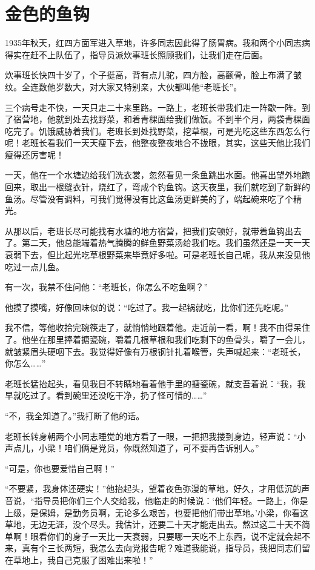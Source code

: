 \documentclass[12pt,UTF-8,openany]{ctexbook}
\begin{document}
\chapter{金色的鱼钩}

\begin{large}
    
    1935年秋天，红四方面军进入草地，许多同志因此得了肠胃病。我和两个小同志病得实在赶不上队伍了，指导员派炊事班长照顾我们，让我们走在后面。
    
    炊事班长快四十岁了，个子挺高，背有点儿驼，四方脸，高颧骨，脸上布满了皱纹。全连数他岁数大，对大家又特别亲，大伙都叫他“老班长”。
    
    三个病号走不快，一天只走二十来里路。一路上，老班长带我们走一阵歇一阵。到了宿营地，他就到处去找野菜，和着青稞面给我们做饭。不到半个月，两袋青稞面吃完了。饥饿威胁着我们。老班长到处找野菜，挖草根，可是光吃这些东西怎么行呢！老班长看我们一天天瘦下去，他整夜整夜地合不拢眼，其实，这些天他比我们瘦得还厉害呢！
    
    一天，他在一个水塘边给我们洗衣裳，忽然看见一条鱼跳出水面。他喜出望外地跑回来，取出一根缝衣针，烧红了，弯成个钓鱼钩。这天夜里，我们就吃到了新鲜的鱼汤。尽管没有调料，可我们觉得没有比这鱼汤更鲜美的了，端起碗来吃了个精光。
    
    从那以后，老班长尽可能找有水塘的地方宿营，把我们安顿好，就带着鱼钩出去了。第二天，他总能端着热气腾腾的鲜鱼野菜汤给我们吃。我们虽然还是一天一天衰弱下去，但比起光吃草根野菜来毕竟好多啦。可是老班长自己呢，我从来没见他吃过一点儿鱼。
    
    有一次，我禁不住问他：“老班长，你怎么不吃鱼啊？”
    
    他摸了摸嘴，好像回味似的说：“吃过了。我一起锅就吃，比你们还先吃呢。”
    
    我不信，等他收拾完碗筷走了，就悄悄地跟着他。走近前一看，啊！我不由得呆住了。他坐在那里捧着搪瓷碗，嚼着几根草根和我们吃剩下的鱼骨头，嚼了一会儿，就皱紧眉头硬咽下去。我觉得好像有万根钢针扎着喉管，失声喊起来：“老班长，你怎么……”
    
    老班长猛抬起头，看见我目不转睛地看着他手里的搪瓷碗，就支吾着说：“我，我早就吃过了。看到碗里还没吃干净，扔了怪可惜的……”
    
    “不，我全知道了。”我打断了他的话。
    
    老班长转身朝两个小同志睡觉的地方看了一眼，一把把我搂到身边，轻声说：“小声点儿，小梁！咱们俩是党员，你既然知道了，可不要再告诉别人。”
    
    “可是，你也要爱惜自己啊！”
    
    “不要紧，我身体还硬实！”他抬起头，望着夜色弥漫的草地，好久，才用低沉的声音说，“指导员把你们三个人交给我，他临走的时候说：‘他们年轻。一路上，你是上级，是保姆，是勤务员啊，无论多么艰苦，也要把他们带出草地。’小梁，你看这草地，无边无涯，没个尽头。我估计，还要二十天才能走出去。熬过这二十天不简单啊！眼看你们的身子一天比一天衰弱，只要哪一天吃不上东西，说不定就会起不来，真有个三长两短，我怎么去向党报告呢？难道我能说，指导员，我把同志们留在草地上，我自己克服了困难出来啦！”
    

\end{large}
\end{document}
